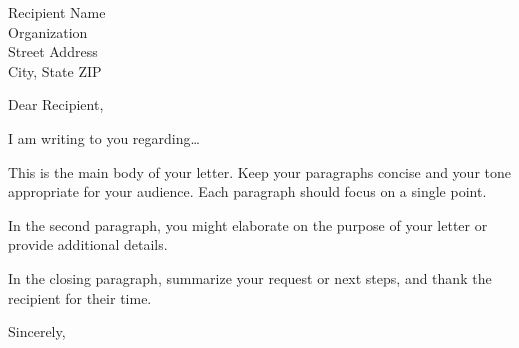 \documentclass{letter}
\begin{document}
\begin{letter}{Recipient Name \\ Organization \\ Street Address \\ City, State ZIP}

\opening{Dear Recipient,}

I am writing to you regarding\ldots

This is the main body of your letter. Keep your paragraphs
concise and your tone appropriate for your audience. Each
paragraph should focus on a single point.

In the second paragraph, you might elaborate on the purpose
of your letter or provide additional details.

In the closing paragraph, summarize your request or next steps,
and thank the recipient for their time.

\closing{Sincerely,}

\end{letter}
\end{document}
